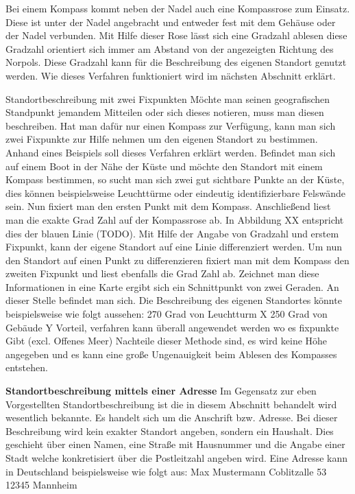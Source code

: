 Bei einem Kompass kommt neben der Nadel auch eine Kompassrose zum Einsatz. Diese ist unter der Nadel angebracht und entweder fest mit dem Gehäuse oder der Nadel verbunden. Mit Hilfe dieser Rose lässt sich eine Gradzahl ablesen diese Gradzahl orientiert sich immer am Abstand von der angezeigten Richtung des Norpols. Diese Gradzahl kann für die Beschreibung des eigenen Standort genutzt werden. Wie dieses Verfahren funktioniert wird im nächsten Abschnitt erklärt.

Standortbeschreibung mit zwei Fixpunkten
Möchte man seinen geografischen Standpunkt jemandem Mitteilen oder sich dieses notieren, muss man diesen beschreiben. Hat man dafür nur einen Kompass zur Verfügung, kann man sich zwei Fixpunkte zur Hilfe nehmen um den eigenen Standort zu bestimmen.
Anhand eines Beispiels soll dieses Verfahren erklärt werden. Befindet man sich auf einem Boot in der Nähe der Küste und möchte den Standort mit einem Kompass bestimmen, so sucht man sich zwei gut sichtbare Punkte an der Küste, dies können beispielsweise Leuchttürme oder eindeutig identifizierbare Felswände sein. Nun fixiert man den ersten Punkt mit dem Kompass. Anschließend liest man die exakte Grad Zahl auf der Kompassrose ab.  In Abbildung XX entspricht dies der blauen Linie (TODO). Mit Hilfe der Angabe von Gradzahl und erstem Fixpunkt, kann der eigene Standort auf eine Linie differenziert werden. Um nun den Standort auf einen Punkt zu differenzieren fixiert man mit dem Kompass den zweiten Fixpunkt und liest ebenfalls die Grad Zahl ab. Zeichnet man diese Informationen in eine Karte ergibt sich ein Schnittpunkt von zwei Geraden. An dieser Stelle befindet man sich. Die Beschreibung des eigenen Standortes könnte beispielsweise wie folgt aussehen:
270 Grad von Leuchtturm X
250 Grad von Gebäude Y
Vorteil, verfahren kann überall angewendet werden wo es fixpunkte Gibt (excl. Offenes Meer)
Nachteile dieser Methode sind, es wird keine Höhe angegeben und es kann eine große Ungenauigkeit beim Ablesen des Kompasses entstehen.

\textbf{Standortbeschreibung mittels einer Adresse}
Im Gegensatz zur eben Vorgestellten Standortbeschreibung ist die in diesem Abschnitt behandelt wird wesentlich bekannte. Es handelt sich um die Anschrift bzw. Adresse. Bei dieser Beschreibung wird kein exakter Standort angeben, sondern ein Haushalt. Dies geschieht über einen Namen, eine Straße mit Hausnummer und die Angabe einer Stadt welche konkretisiert über die Postleitzahl angeben wird.  
Eine Adresse kann in Deutschland beispielsweise wie folgt aus:
Max Mustermann 
Coblitzalle 53
12345 Mannheim


